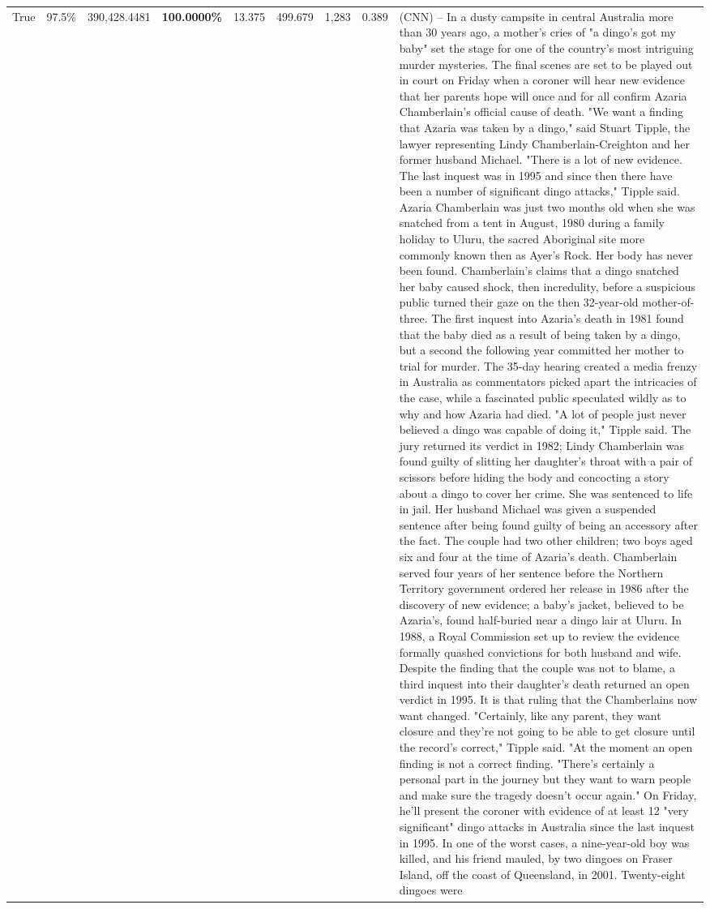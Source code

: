 \begin{table}[H]
\begin{tabular}{lllrlllll}
True & 97.5\% & 390,428.4481 & \bfseries \color{red} 100.0000\% & 13.375 & 499.679 & 1,283 & 0.389 & (CNN) -- In a dusty campsite in central Australia more than 30 years ago, a mother's cries of "a dingo's got my baby" set the stage for one of the country's most intriguing murder mysteries. The final scenes are set to be played out in court on Friday when a coroner will hear new evidence that her parents hope will once and for all confirm Azaria Chamberlain's official cause of death. "We want a finding that Azaria was taken by a dingo," said Stuart Tipple, the lawyer representing Lindy Chamberlain-Creighton and her former husband Michael. "There is a lot of new evidence. The last inquest was in 1995 and since then there have been a number of significant dingo attacks," Tipple said. Azaria Chamberlain was just two months old when she was snatched from a tent in August, 1980 during a family holiday to Uluru, the sacred Aboriginal site more commonly known then as Ayer's Rock. Her body has never been found. Chamberlain's claims that a dingo snatched her baby caused shock, then incredulity, before a suspicious public turned their gaze on the then 32-year-old mother-of-three. The first inquest into Azaria's death in 1981 found that the baby died as a result of being taken by a dingo, but a second the following year committed her mother to trial for murder. The 35-day hearing created a media frenzy in Australia as commentators picked apart the intricacies of the case, while a fascinated public speculated wildly as to why and how Azaria had died. "A lot of people just never believed a dingo was capable of doing it," Tipple said. The jury returned its verdict in 1982; Lindy Chamberlain was found guilty of slitting her daughter's throat with a pair of scissors before hiding the body and concocting a story about a dingo to cover her crime. She was sentenced to life in jail. Her husband Michael was given a suspended sentence after being found guilty of being an accessory after the fact. The couple had two other children; two boys aged six and four at the time of Azaria's death. Chamberlain served four years of her sentence before the Northern Territory government ordered her release in 1986 after the discovery of new evidence; a baby's jacket, believed to be Azaria's, found half-buried near a dingo lair at Uluru. In 1988, a Royal Commission set up to review the evidence formally quashed convictions for both husband and wife. Despite the finding that the couple was not to blame, a third inquest into their daughter's death returned an open verdict in 1995. It is that ruling that the Chamberlains now want changed. "Certainly, like any parent, they want closure and they're not going to be able to get closure until the record's correct," Tipple said. "At the moment an open finding is not a correct finding. "There's certainly a personal part in the journey but they want to warn people and make sure the tragedy doesn't occur again." On Friday, he'll present the coroner with evidence of at least 12 "very significant" dingo attacks in Australia since the last inquest in 1995. In one of the worst cases, a nine-year-old boy was killed, and his friend mauled, by two dingoes on Fraser Island, off the coast of Queensland, in 2001. Twenty-eight dingoes were 
\end{tabular}
\end{table}
